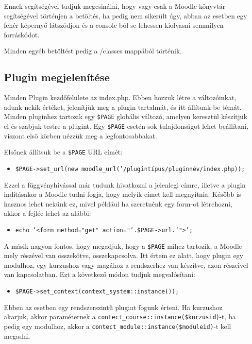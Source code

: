 Ennek segítségével tudjuk megcsinálni, hogy vagy csak a Moodle könyvtár segítségével történjen a betöltés, ha pedig nem sikerült úgy, abban az esetben egy fehér képernyő látszódjon és a console-ból se lehessen kiolvasni semmilyen forráskódot. \par
Minden egyéb betöltést pedig a /classes mappából történik. 

\subsection{Plugin megjelenítése}

Minden Plugin kezdőfelülete az index.php. Ebben hozzuk létre a változóinkat, adunk nekik értéket, jelenítjük meg a plugin tartalmát, és itt állítunk be témát. Minden pluginhez tartozik egy \texttt{\$PAGE} globális változó, amelyen keresztül készítjük el és szabjuk testre a plugint. Egy \texttt{\$PAGE} esetén sok tulajdonságot lehet beállítani, viszont első körben nézzük meg a legfontosabbakat. \par
Elsőnek állítsuk be a \texttt{\$PAGE} URL címét: 
\begin{itemize}
    \item[] \texttt{\$PAGE->set\_url(new moodle\_url('/plugintípus/pluginnév/index.php));}
\end{itemize}

Ezzel a függvényhívással már tudunk hivatkozni a jelenlegi címre, illetve a plugin indításakor a Moodle tudni fogja, hogy melyik címet kell megnyitnia. Később is hasznos lehet nekünk ez, mivel például ha szeretnénk egy form-ot létrehozni, akkor a fejléc lehet az alábbi:
\begin{itemize}
    \item[] \texttt{echo '<form method="get" action="'.\$PAGE->url.'">';}
\end{itemize}

A másik nagyon fontos, hogy megadjuk, hogy a \texttt{\$PAGE} mihez tartozik, a Moodle mely részével van összekötve, összekapcsolva. Itt értem ez alatt, hogy plugin egy modulhoz, egy kurzushoz vagy magához a rendszerhez van készítve, azon részeivel van kapcsolatban. Ezt a következő módon tudjuk megvalósítani:

\begin{itemize}
    \item[] \texttt{\$PAGE->set\_context(context\_system::instance());}
\end{itemize}

Ebben az esetben egy rendszerszintű plugint fogunk érteni. Ha kurzushoz akarjuk, akkor paraméternek a \texttt{contect\_course::instance(\$kurzusid)}-t, ha pedig egy modulhoz, akkor a \texttt{contect\_module::instance(\$moduleid)}-t kell megadni. \par

